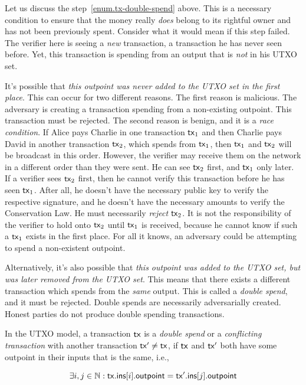 Let us discuss the step~\ref{enum.tx-double-spend} above.
This is a necessary condition to ensure that the money really \emph{does} belong to its rightful owner and
has not been previously spent.
Consider what it would mean if this step failed.
The verifier here is seeing a \emph{new} transaction, a transaction he has never seen before.
Yet, this transaction is spending from an output that is \emph{not} in his UTXO set.

It's possible that \emph{this outpoint was never added to the UTXO set in the first place}.
This can occur for two different reasons.
The first reason is malicious. The adversary is creating a transaction spending from
a non-existing outpoint. This transaction must be rejected.
The second reason is benign, and it is a \emph{race condition}.
If Alice pays Charlie in one transaction $\mathsf{tx}_1$ and then Charlie pays David in another
transaction $\mathsf{tx}_2$, which spends from $\mathsf{tx}_1$, then $\mathsf{tx}_1$ and $\mathsf{tx}_2$ will be broadcast
in this order. However, the verifier may receive them on the network
in a different order than they were sent. He can see $\mathsf{tx}_2$ first, and $\mathsf{tx}_1$ only later.
If a verifier sees $\mathsf{tx}_2$ first, then
he cannot verify this transaction before he has seen $\mathsf{tx}_1$. After all, he doesn't have
the necessary public key to verify the respective signature, and he doesn't have the
necessary amounts to verify the Conservation Law.
He must necessarily \emph{reject}
$\mathsf{tx}_2$. It is not
the responsibility of the verifier to hold onto $\mathsf{tx}_2$ until $\mathsf{tx}_1$ is received,
because he cannot know if such a $\mathsf{tx}_1$ exists in the first place. For all it knows,
an adversary could be attempting to spend a non-existent outpoint.

Alternatively, it's also possible that \emph{this outpoint was added to the UTXO set, but was later
removed from the UTXO set}. This means that there exists a different transaction
which spends from the \emph{same} output. This is called a \emph{double spend},
and it must be rejected. Double spends are necessarily adversarially created.
Honest parties do not produce double spending transactions.

\begin{definition}
  In the UTXO model, a transaction $\mathsf{tx}$ is a \emph{double spend} or a
  \emph{conflicting transaction} with another transaction $\mathsf{tx}' \neq \mathsf{tx}$,
  if $\mathsf{tx}$ and $\mathsf{tx}'$ both have some outpoint in their inputs that is the
  same, i.e.,

  \[
    \exists i, j \in \mathbb{N}: \mathsf{tx}\textsf{.ins}[i]\textsf{.outpoint} = \mathsf{tx}'\textsf{.ins}[j]\textsf{.outpoint}
  \]
\end{definition}

